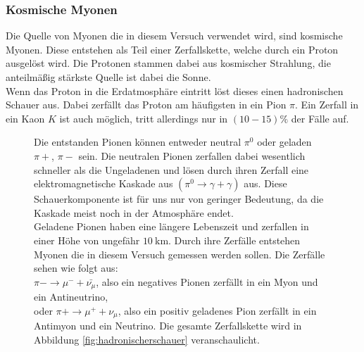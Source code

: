 \subsubsection{Kosmische Myonen}
Die Quelle von Myonen die in diesem Versuch verwendet wird, sind kosmische Myonen.
Diese entstehen als Teil einer Zerfallskette, welche durch ein Proton ausgelöst wird.
Die Protonen stammen dabei aus kosmischer Strahlung, die anteilmäßig stärkste Quelle ist dabei die Sonne.\\
Wenn das Proton in die Erdatmosphäre eintritt löst dieses einen hadronischen Schauer aus.
Dabei zerfällt das Proton am häufigsten in ein Pion $\pi$.
Ein Zerfall in ein Kaon $K$ ist auch möglich, tritt allerdings nur in $(10-15)\%$ \cite{myonen} der Fälle auf.
\FloatBarrier
\begin{figure}
    \begin{minipage}{0.55\textwidth}
Die entstanden Pionen können entweder neutral $\pi^0$ oder geladen $\pi+$, $\pi-$ sein.
Die neutralen Pionen zerfallen dabei wesentlich schneller als die Ungeladenen und lösen durch ihren Zerfall eine elektromagnetische Kaskade aus $(\pi^0 \rightarrow \gamma +\gamma)$ aus.
Diese Schauerkomponente ist für uns nur von geringer Bedeutung, da die Kaskade meist noch in der Atmosphäre endet.\\
Geladene Pionen haben eine längere Lebenszeit und zerfallen in einer Höhe von ungefähr $\SI{10}{\kilo\meter}$.
Durch ihre Zerfälle entstehen Myonen die in diesem Versuch gemessen werden sollen.
Die Zerfälle sehen wie folgt aus:\\ $\pi-\rightarrow \mu^- +\bar{\nu_\mu}$, also ein negatives Pionen zerfällt in ein Myon und ein Antineutrino,\\ oder $\pi+\rightarrow \mu^+ + \nu_\mu$, also ein positiv geladenes Pion zerfällt in ein Antimyon und ein Neutrino.
Die gesamte Zerfallskette wird in Abbildung \ref{fig:hadronischerschauer} veranschaulicht.
\end{minipage}
\hfill
\begin{minipage}{0.4\textwidth}

\end{minipage}
\end{figure}
